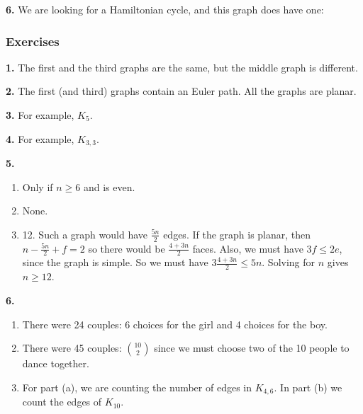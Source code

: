\documentclass[10pt,]{book}
\theoremstyle{plain}
\theoremstyle{definition}
\theoremstyle{definition}
\theoremstyle{definition}
\numberwithin{equation}{chapter}
\newcommand{\vtx}[2]{node[fill,circle,inner sep=0pt, minimum size=4pt,label=#1:#2]{}}
\renewcommand{\v}{\vtx{above}{}}
\begin{document}
\par\smallskip
\noindent\textbf{6.}\quad{}
We are looking for a Hamiltonian cycle, and this graph does have one:
%
\leavevmode%
\begin{figure}
\centering
{
}
\end{figure}
\par\smallskip
\subsubsection*{ Exercises}
\noindent\textbf{1.}\quad{}
            The first and the third graphs are the same, but the middle graph is different.
\par\smallskip
\noindent\textbf{2.}\quad{}
            The first (and third) graphs contain an Euler path. All the graphs are planar.
\par\smallskip
\noindent\textbf{3.}\quad{}
            For example, \(K_5\).
\par\smallskip
\noindent\textbf{4.}\quad{}
            For example, \(K_{3,3}\).
\par\smallskip
\noindent\textbf{5.}\quad{}\leavevmode%
\begin{enumerate}[label=(\alph*)]
\item\hypertarget{li-1244}{}
                Only if \(n \ge 6\) and is even.
\item\hypertarget{li-1245}{}
                None.
\item\hypertarget{li-1246}{}
                12. Such a graph would have \(\frac{5n}{2}\) edges. If the graph is planar, then \(n - \frac{5n}{2} + f = 2\) so there would be \(\frac{4+3n}{2}\) faces. Also, we must have \(3f \le 2e\), since the graph is simple. So we must have \(3\frac{4 + 3n}{2} \le 5n\). Solving for \(n\) gives \(n \ge 12\).
\end{enumerate}
\par\smallskip
\noindent\textbf{6.}\quad{}\leavevmode%
\begin{enumerate}[label=(\alph*)]
\item\hypertarget{li-1250}{}
                There were 24 couples: 6 choices for the girl and 4 choices for the boy.
\item\hypertarget{li-1251}{}
                There were 45 couples: \({10 \choose 2}\) since we must choose two of the 10 people to dance together.
\item\hypertarget{li-1252}{}
                For part (a), we are counting the number of edges in \(K_{4,6}\). In part (b) we count the edges of \(K_{10}\).
\end{enumerate}
\end{document}
